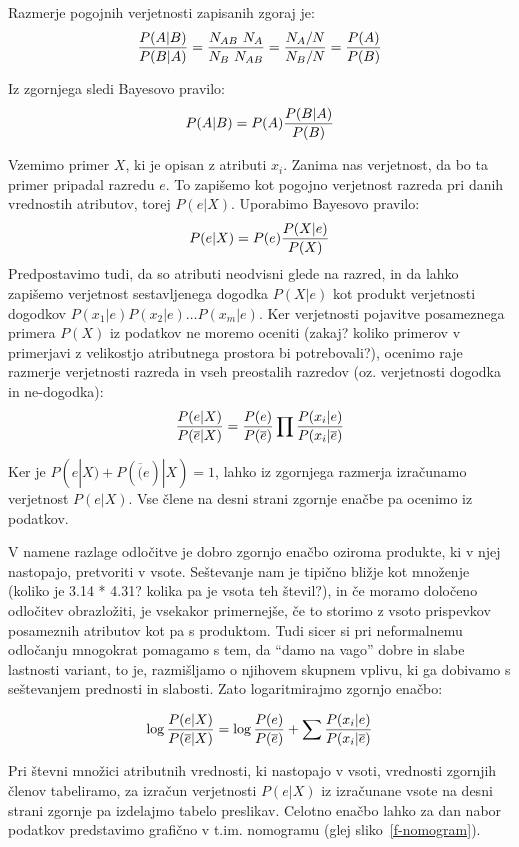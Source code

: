 Razmerje pogojnih verjetnosti zapisanih zgoraj je:
$${P(A|B) \over P(B|A)} = {N_{AB}\ N_A \over N_{B}\ N_{AB}} = {N_A/N \over N_B/N} = {P(A)\over P(B)}$$

Iz zgornjega sledi Bayesovo pravilo:
$$P(A|B)=P(A){P(B|A) \over P(B)}$$

Vzemimo primer $X$, ki je opisan z atributi $x_i$. Zanima nas verjetnost, da bo ta primer pripadal razredu $e$. To zapišemo kot pogojno verjetnost razreda pri danih vrednostih atributov, torej $P(e|X)$. Uporabimo Bayesovo pravilo:
%
$$ P(e|X) = P(e) {P(X|e) \over P(X)} $$
%
Predpostavimo tudi, da so atributi neodvisni glede na razred, in da lahko zapišemo verjetnost sestavljenega dogodka $P(X|e)$ kot produkt verjetnosti dogodkov $P(x_1|e)P(x_2|e)\ldots P(x_m|e)$. Ker verjetnosti pojavitve posameznega primera $P(X)$ iz podatkov ne moremo oceniti (zakaj? koliko primerov v primerjavi z velikostjo atributnega prostora bi potrebovali?), ocenimo raje razmerje verjetnosti razreda in vseh preostalih razredov (oz. verjetnosti dogodka in ne-dogodka):
%
$$ {P(e|X)\over P(\overline{e}|X)} = {P(e)\over P(\overline{e})} 
\prod {P(x_i|e)\over P(x_i|\overline{e})} $$

Ker je $P(e|X)+P(\overline(e)|X)=1$, lahko iz zgornjega razmerja izračunamo verjetnost $P(e|X)$. Vse člene na desni strani zgornje enačbe pa ocenimo iz podatkov.

V namene razlage odločitve je dobro zgornjo enačbo oziroma produkte, ki v njej nastopajo, pretvoriti v vsote. Seštevanje nam je tipično bližje kot množenje (koliko je 3.14 * 4.31? kolika pa je vsota teh števil?), in če moramo določeno odločitev obrazložiti, je vsekakor primernejše, če to storimo z vsoto prispevkov posameznih atributov kot pa s produktom. Tudi sicer si pri neformalnemu odločanju mnogokrat pomagamo s tem, da ``damo na vago'' dobre in slabe lastnosti variant, to je, razmišljamo o njihovem skupnem vplivu, ki ga dobivamo s seštevanjem prednosti in slabosti. Zato logaritmirajmo zgornjo enačbo:

$$ \log{P(e|X)\over P(\overline{e}|X)} = \log{P(e)\over P(\overline{e})} + \sum {P(x_i|e)\over P(x_i|\overline{e})} $$

Pri števni množici atributnih vrednosti, ki nastopajo v vsoti, vrednosti zgornjih členov tabeliramo, za izračun verjetnosti $P(e|X)$ iz izračunane vsote na desni strani zgornje pa izdelajmo tabelo preslikav. Celotno enačbo lahko za dan nabor podatkov predstavimo grafično v t.im. nomogramu (glej sliko~\ref{f-nomogram}).

